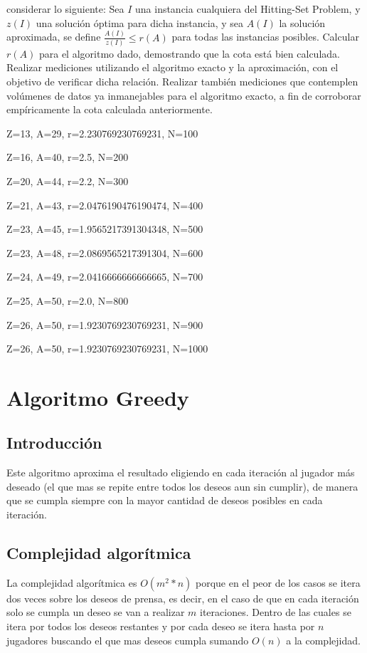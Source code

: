 \documentclass{estilo}
\begin{document}
considerar lo siguiente:
    Sea $I$ una instancia cualquiera del Hitting-Set Problem, y $z(I)$ una
    solución óptima para dicha instancia, y sea $A(I)$ la solución aproximada,
    se define $\frac{A(I)}{z(I)} \leq r(A)$ para todas las instancias posibles.
    Calcular $r(A)$ para el algoritmo dado, demostrando que la cota está bien
    calculada. Realizar mediciones utilizando el algoritmo exacto y la aproximación,
    con el objetivo de verificar dicha relación. Realizar también mediciones
    que contemplen volúmenes de datos ya inmanejables para el algoritmo exacto,
    a fin de corroborar empíricamente la cota calculada anteriormente.


Z=13, A=29, r=2.230769230769231, N=100

Z=16, A=40, r=2.5, N=200

Z=20, A=44, r=2.2, N=300

Z=21, A=43, r=2.0476190476190474, N=400

Z=23, A=45, r=1.9565217391304348, N=500

Z=23, A=48, r=2.0869565217391304, N=600

Z=24, A=49, r=2.0416666666666665, N=700

Z=25, A=50, r=2.0, N=800

Z=26, A=50, r=1.9230769230769231, N=900

Z=26, A=50, r=1.9230769230769231, N=1000


\newpage

\section{Algoritmo Greedy}

\subsection{Introducción}

Este algoritmo aproxima el resultado eligiendo en cada iteración al jugador más deseado (el que mas se repite entre todos los deseos aun sin cumplir), de manera que se cumpla siempre con la mayor cantidad de deseos posibles en cada iteración.

\subsection{Complejidad algorítmica}

La complejidad algorítmica es $O(m^2 * n)$ porque en el peor de los casos se itera dos veces sobre los deseos de prensa, es decir, en el caso de que en cada iteración solo se cumpla un deseo se van a realizar $m$ iteraciones. Dentro de las cuales se itera por todos los deseos restantes y por cada deseo se itera hasta por $n$ jugadores buscando el que mas deseos cumpla sumando $O(n)$ a la complejidad.
\end{document}

